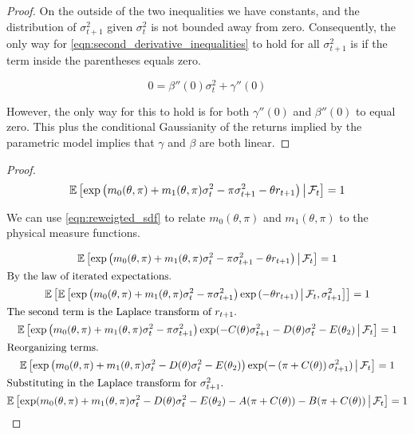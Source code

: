 \documentclass[11pt, letterpaper, twoside]{article}
\begin{document}
\begin{appendices}
\begin{proof}
 On the outside of the two inequalities we have constants, and the distribution of $\sigma^2_{t+1}$ given $\sigma^2_t$ is not bounded away from zero. Consequently, the only way for \cref{eqn:second_derivative_inequalities} to hold for all $\sigma^2_{t+1}$ is if the term inside the parentheses equals zero.

 \begin{equation}
 0 = \beta''(0) \sigma^2_t + \gamma''(0)
 \end{equation}

 However, the only way for this to hold is for both $\gamma''(0)$ and $\beta''(0)$ to equal zero.
 This plus the conditional Gaussianity of the returns implied by the parametric model implies that $\gamma$
 and $\beta$ are both linear.

\end{proof}


\sdfConstants*

\begin{proof}

\begin{equation}
 \label{eqn:reweigted_sdf}
 \operatorname{\mathbb{E}}\left[\exp\left(m_0(\theta, \pi) + m_1(\theta, \pi) \sigma^2_t - \pi \sigma^2_{t+1} - \theta r_{t+1}
 \right) \,\middle\vert\, \mathcal{F}_t \right] = 1 
\end{equation}

We can use \cref{eqn:reweigted_sdf} to relate $m_0(\theta, \pi)$ and $m_1(\theta, \pi)$ to the physical measure
functions. 

\begin{gather}
 \E\left[\exp\left(m_0(\theta, \pi) + m_1(\theta, \pi) \sigma^2_t - \pi \sigma^2_{t+1} - \theta r_{t+1}
 \right) \mvert \F_t \right] = 1 \\
%
 \intertext{By the law of iterated expectations.}
%
 \E\left[ \E\left[\exp\left(m_0(\theta, \pi) + m_1(\theta, \pi) \sigma^2_t - \pi \sigma^2_{t+1}\right)
 \exp\left( - \theta r_{t+1}\right) \mvert \F_t, \sigma^2_{t+1} \right]\right] = 1 \\
%
 \intertext{The second term is the Laplace transform of $r_{t+1}$.}
%
 \E\left[\exp\left(m_0(\theta, \pi) + m_1(\theta, \pi) \sigma^2_t - \pi \sigma^2_{t+1} \right)
 \exp(-C(\theta) \sigma^2_{t+1} - D(\theta) \sigma^2_{t} - E(\theta_2) \mvert \F_t \right] = 1 \\
%
 \intertext{Reorganizing terms.}
%
 \E\left[\exp\left(m_0(\theta, \pi) + m_1(\theta, \pi) \sigma^2_t - D(\theta) \sigma^2_{t} - E(\theta_2)
 \right) \exp(-\left(\pi + C(\theta)\right) \sigma^2_{t+1}) \mvert \F_t \right] = 1 \\ 
%
 \intertext{Substituting in the Laplace transform for $\sigma^2_{t+1}$.} 
%
 \label{eqn:expected_sdf_wrt_PP}
 \E\left[\exp(m_0(\theta, \pi) + m_1(\theta, \pi) \sigma^2_t - D(\theta) \sigma^2_{t} - E(\theta_2) - A(\pi +
 C(\theta)) - B(\pi + C(\theta)) \mvert \F_t \right] = 1 
\end{gather}


\end{proof}
\end{appendices}
\end{document}
